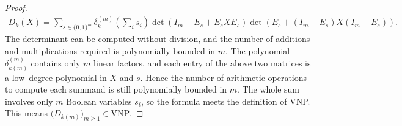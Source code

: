 \documentclass[11pt,a4paper]{article}
\begin{document}
\begin{proof}
\begin{eqnarray*}
  D_k(X)
  =\sum_{s\in\{0,1\}^m}
  \delta_k^{(m)}\!\left(\sum_i s_i\right)
  \operatorname{det}(I_m-E_s+E_sXE_s)
  \operatorname{det}(E_s+(I_m-E_s)X(I_m-E_s)).
\end{eqnarray*}
The determinant can be computed without division, and the number of additions and multiplications required is polynomially bounded in $m$. The polynomial $\delta_{k(m)}^{(m)}$ contains only $m$ linear factors, and each entry of the above two matrices is a low–degree polynomial in $X$ and $s$. Hence the number of arithmetic operations to compute each summand is still polynomially bounded in $m$. The whole sum involves only $m$ Boolean variables $s_i$, so the formula meets the definition of VNP. This means $\bigl(D_{k(m)}\bigr)_{m\geq1}\in\mathrm{VNP}$.


\end{proof}
\end{document}
